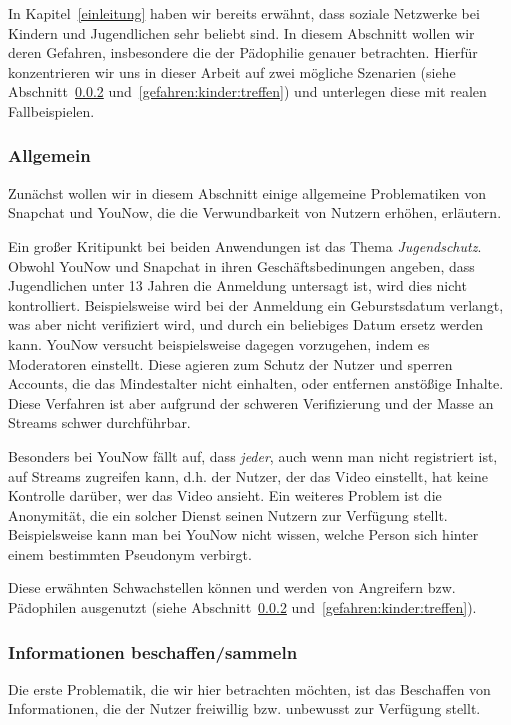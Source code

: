 In Kapitel~\ref{einleitung} haben wir bereits erw\"ahnt, dass soziale Netzwerke
bei Kindern und Jugendlichen sehr beliebt sind. In diesem Abschnitt wollen wir
deren Gefahren, insbesondere die der P\"adophilie genauer betrachten. Hierf\"ur
konzentrieren wir uns in dieser Arbeit auf zwei m\"ogliche Szenarien (siehe
Abschnitt~\ref{gefahren:kinder:informationen}
und~\ref{gefahren:kinder:treffen}) und unterlegen diese mit realen
Fallbeispielen.


\subsubsection{Allgemein}
\label{gefahren:kinder:allgemein}
Zun\"achst wollen wir in diesem Abschnitt einige allgemeine Problematiken von
Snapchat und YouNow, die die Verwundbarkeit von Nutzern erh\"ohen, erl\"autern.

Ein gro{\ss}er Kritipunkt bei beiden Anwendungen ist das Thema
\emph{Jugendschutz}. Obwohl YouNow und Snapchat in ihren Gesch\"aftsbedinungen
angeben, dass Jugendlichen unter 13 Jahren die Anmeldung untersagt ist, wird
dies nicht kontrolliert. Beispielsweise wird bei der Anmeldung ein
Geburstsdatum verlangt, was aber nicht verifiziert wird, und durch ein
beliebiges Datum ersetz werden kann. YouNow versucht beispielsweise dagegen
vorzugehen, indem es Moderatoren einstellt. Diese agieren zum Schutz der Nutzer
und sperren Accounts, die das Mindestalter nicht einhalten, oder entfernen
anst\"o{\ss}ige Inhalte. Diese Verfahren ist aber aufgrund der schweren
Verifizierung und der Masse an Streams schwer durchf\"uhrbar.

Besonders bei YouNow f\"allt auf, dass \emph{jeder}, auch wenn man nicht
registriert ist, auf Streams zugreifen kann, d.h. der Nutzer, der das Video
einstellt, hat keine Kontrolle dar\"uber, wer das Video ansieht. Ein weiteres
Problem ist die Anonymit\"at, die ein solcher Dienst seinen Nutzern zur
Verf\"ugung stellt. Beispielsweise kann man bei YouNow nicht wissen, welche
Person sich hinter einem bestimmten Pseudonym verbirgt.

Diese erw\"ahnten Schwachstellen k\"onnen und werden von Angreifern bzw.
P\"adophilen ausgenutzt (siehe Abschnitt~\ref{gefahren:kinder:informationen}
und~\ref{gefahren:kinder:treffen}).

\subsubsection{Informationen beschaffen/sammeln}
\label{gefahren:kinder:informationen}
Die erste Problematik, die wir hier betrachten m\"ochten, ist das Beschaffen von
Informationen, die der Nutzer freiwillig bzw. unbewusst zur Verf\"ugung stellt.

